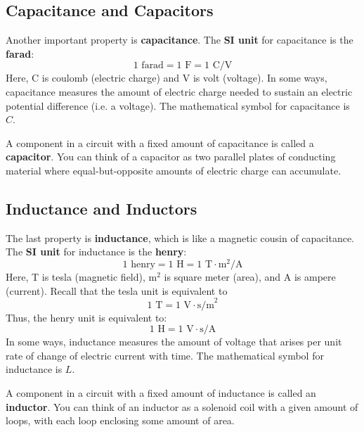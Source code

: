 \subsection{Capacitance and Capacitors}
Another important property is \textbf{capacitance}. The \textbf{SI unit} for capacitance is the \textbf{farad}:
\begin{equation}
	1 \text{ farad} = 1 \text{ F} = 1 \text{ C/V}
\end{equation}
Here, C is coulomb (electric charge) and V is volt (voltage). In some ways, capacitance measures the amount of electric charge needed to sustain an electric potential difference (i.e. a voltage). The mathematical symbol for capacitance is $C$.

A component in a circuit with a fixed amount of capacitance is called a \textbf{capacitor}. You can think of a capacitor as two parallel plates of conducting material where equal-but-opposite amounts of electric charge can accumulate.
\subsection{Inductance and Inductors}
The last property is \textbf{inductance}, which is like a magnetic cousin of capacitance. The \textbf{SI unit} for inductance is the \textbf{henry}:
\begin{equation}
	1 \text{ henry} = 1 \text{ H} = 1 \text{ T}\cdot\text{m}^{2}\text{/A}
\end{equation}
Here, T is tesla (magnetic field), m$^{2}$ is square meter (area), and A is ampere (current). Recall that the tesla unit is equivalent to
\begin{equation}
    1 \text{ T} = 1 \text{ V} \cdot \text{s/m}^{2}
\end{equation}
Thus, the henry unit is equivalent to:
\begin{equation}
    1 \text{ H} = 1 \text{ V}\cdot\text{s/A}
\end{equation}
In some ways, inductance measures the amount of voltage that arises per unit rate of change of electric current with time. The mathematical symbol for inductance is $L$.

A component in a circuit with a fixed amount of inductance is called an \textbf{inductor}. You can think of an inductor as a solenoid coil with a given amount of loops, with each loop enclosing some amount of area.
